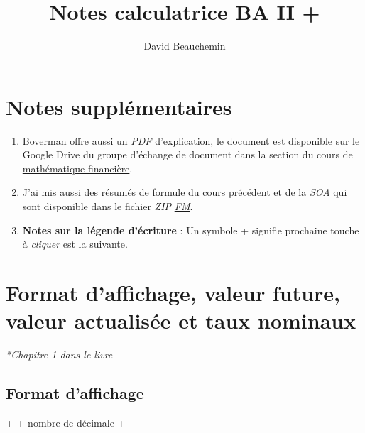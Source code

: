 \documentclass[11pt,french]{report}
\title{Notes calculatrice BA II +}
\author{David Beauchemin}
\begin{document}
\maketitle

\tableofcontents

\chapter{Notes supplémentaires}

\begin{enumerate}
\item Boverman offre aussi un \emph{PDF} d'explication, le document est disponible sur le Google Drive du groupe d'échange de document dans la section du cours de \href{https://drive.google.com/open?id=0B6kXivc6X9LITmdBVFVWSDAxeE0}{mathématique financière}.
\item J'ai mis aussi des résumés de formule du cours précédent et de la \emph{SOA} qui sont disponible dans le fichier \emph{ZIP}  \href{https://drive.google.com/open?id=0B6kXivc6X9LIYUFKaHcxNmtiUUk}{\emph{FM}}.
\item \textbf{Notes sur la légende d'écriture} : 
Un symbole + signifie prochaine touche à \textit{cliquer} est la suivante.

\end{enumerate}

\chapter{Format d'affichage, valeur future, valeur actualisée et taux nominaux}

\textit{*Chapitre 1 dans le livre}

\section{Format d'affichage}
 +  + nombre de décimale + 
\end{document}

